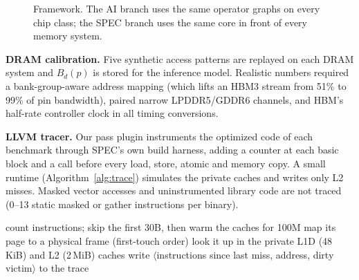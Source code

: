 \documentclass[conference]{IEEEtran}
\begin{document}
\begin{figure}[t]
\caption{Framework. The AI branch uses the same operator graphs on every chip class; the SPEC branch uses the same core in front of every memory system.}
\label{fig:framework}
\end{figure}

\textbf{DRAM calibration.} Five synthetic access patterns are replayed on each DRAM system and $B_d(p)$ is stored for the inference model. Realistic numbers required a bank-group-aware address mapping (which lifts an HBM3 stream from 51\% to 99\% of pin bandwidth), paired narrow LPDDR5/GDDR6 channels, and HBM's half-rate controller clock in all timing conversions.

\textbf{LLVM tracer.} Our pass plugin instruments the optimized code of each benchmark through SPEC's own build harness, adding a counter at each basic block and a call before every load, store, atomic and memory copy. A small runtime (Algorithm~\ref{alg:trace}) simulates the private caches and writes only L2 misses. Masked vector accesses and uninstrumented library code are not traced (0--13 static masked or gather instructions per binary).

\begin{algorithm}[t]
\caption{Tracer runtime}
\label{alg:trace}
\begin{algorithmic}[1]
\STATE count instructions; skip the first 30B, then warm the caches for 100M
  \STATE map its page to a physical frame (first-touch order)
  \STATE look it up in the private L1D (48\,KiB) and L2 (2\,MiB) caches
    \STATE write $\langle$instructions since last miss, address, dirty victim$\rangle$ to the trace
  \ENDIF
\ENDFOR
\end{algorithmic}
\end{algorithm}
\end{document}

